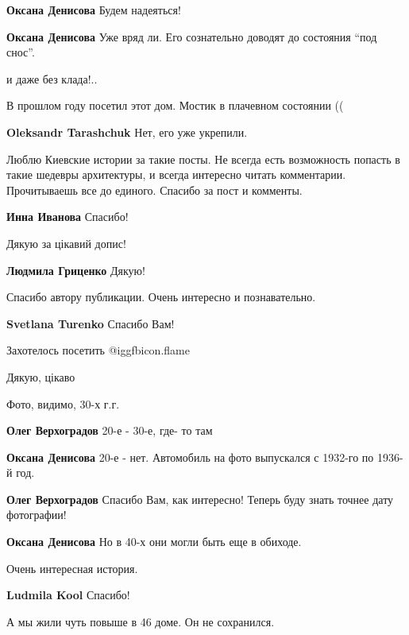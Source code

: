 \begin{itemize}
\begin{itemize}
\textbf{Оксана Денисова} Будем надеяться!

\textbf{Оксана Денисова} Уже вряд ли. Его сознательно доводят до состояния \enquote{под снос}.


и даже без клада!..
\end{itemize} %

В прошлом году посетил этот дом. Мостик в плачевном состоянии ((

\textbf{Oleksandr Tarashchuk} Нет, его уже укрепили.


Люблю Киевские истории за такие посты. Не всегда есть возможность попасть в
такие шедевры архитектуры, и всегда интересно читать комментарии. Прочитываешь
все до единого. Спасибо за пост и комменты.


\textbf{Инна Иванова} Спасибо!

Дякую за цікавий допис!

\textbf{Людмила Гриценко} Дякую!

Спасибо автору публикации. Очень интересно и познавательно.

\textbf{Svetlana Turenko} Спасибо Вам!

Захотелось посетить @igg{fbicon.flame} 

Дякую, цікаво

Фото, видимо, 30-х г.г.

\begin{itemize} %
\textbf{Олег Верхоградов} 20-е - 30-е, где- то там

\textbf{Оксана Денисова} 20-е - нет. Автомобиль на фото выпускался с 1932-го по 1936-й год.

\textbf{Олег Верхоградов} Спасибо Вам, как интересно! Теперь буду знать точнее дату фотографии!

\textbf{Оксана Денисова} Но в 40-х они могли быть еще в обиходе.
\end{itemize} %

Очень интересная история.

\textbf{Ludmila Kool} Спасибо!

А мы жили чуть повыше в 46 доме. Он не сохранился.

\end{itemize} %

